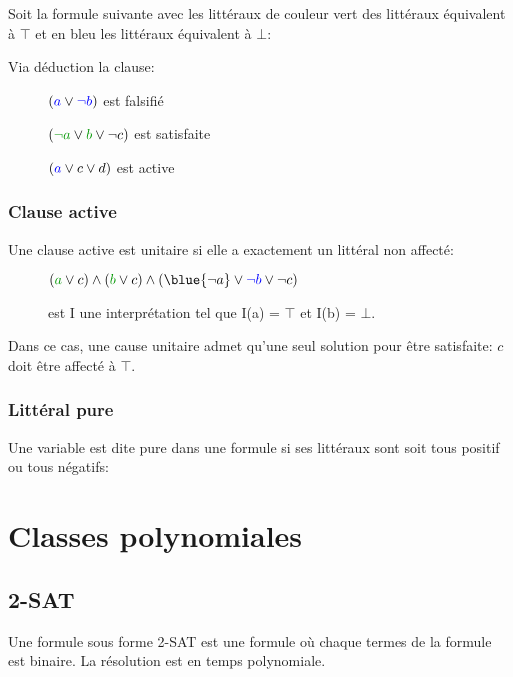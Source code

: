 Soit la formule suivante avec les littéraux de couleur vert des littéraux équivalent à $\top$ et en bleu les littéraux équivalent à $\bot$:\\

Via déduction la clause:
\begin{description}
\item[] $(\textcolor{blue}{a} \vee \textcolor{blue}{\neg b})$ est falsifié
\item[] $(\cvert{\neg a} \vee \cvert{b} \vee \neg c)$ est satisfaite
\item[] $(\textcolor{blue}{a} \vee c \vee d)$ est active
\end{description}

\pagebreak
\subsection{Clause active}
Une clause active est unitaire si elle a exactement un littéral non affecté:
\begin{description}
\item[] $(\cvert{a} \vee c) \wedge (\cvert{b} \vee c) \wedge (\blue{\neg a} \vee \cblue{\neg b} \vee \neg c)$
\item[] est I une interprétation tel que I(a) = $\top$ et I(b) = $\bot$.
\end{description}
Dans ce cas, une cause unitaire admet qu'une seul solution pour être satisfaite:
$c$ doit être affecté à $\top$.\\

\subsection{Littéral pure}
Une variable est dite pure dans une formule si ses littéraux sont soit tous positif ou tous négatifs:\\
\pagebreak

\chapter{Classes polynomiales}
\pagebreak
\section{2-SAT}
Une formule sous forme 2-SAT est une formule où chaque termes de la formule est binaire.
La résolution est en temps polynomiale.\\


